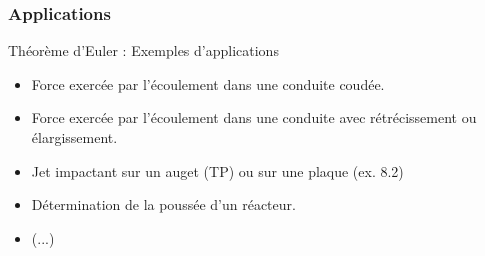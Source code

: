 \subsubsection{Applications}
\begin{frame}{Théorème d'Euler : Exemples d'applications}

\small

\begin{itemize}



\item
	Force exercée par  l'écoulement dans une conduite coudée.
	
	\item
	Force exercée par l'écoulement dans une conduite avec rétrécissement ou élargissement.

	\item
	Jet impactant sur un auget (TP) ou sur une plaque (ex. 8.2)
\item
	Détermination de la poussée d'un réacteur.
	
\item (...)	

\end{itemize}

\vspace{30mm}

\end{frame}


